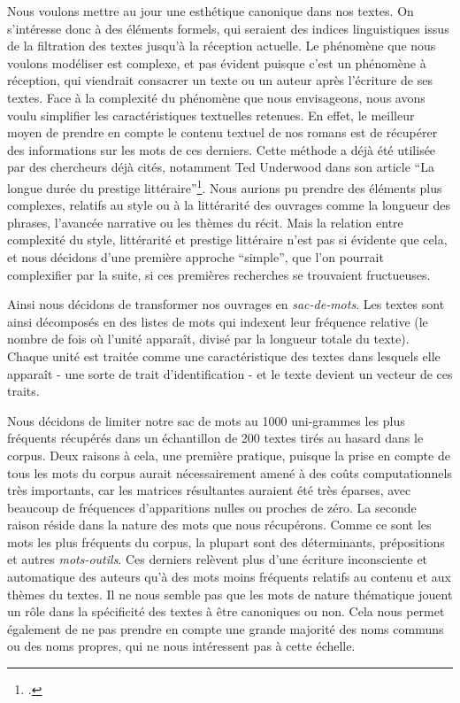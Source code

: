 Nous voulons mettre au jour une esthétique canonique dans nos textes. On s'intéresse donc à des éléments formels, qui seraient des indices linguistiques issus de la filtration des textes jusqu'à la réception actuelle. Le phénomène que nous voulons modéliser est complexe, et pas évident puisque c'est un phénomène à réception, qui viendrait consacrer un texte ou un auteur après l'écriture de ses textes. Face à la complexité du phénomène que nous envisageons, nous avons voulu simplifier les caractéristiques textuelles retenues. En effet, le meilleur moyen de prendre en compte le contenu textuel de nos romans est de récupérer des informations sur les mots de ces derniers. Cette méthode a déjà été utilisée par des chercheurs déjà cités, notamment Ted Underwood dans son article \enquote{La longue durée du prestige littéraire}\footcites{underwood_longue_2016}.  Nous aurions pu prendre des éléments plus complexes, relatifs au style ou à la littérarité des ouvrages comme la longueur des phrases, l'avancée narrative ou les thèmes du récit. Mais la relation entre complexité du style, littérarité et prestige littéraire n'est pas si évidente que cela, et nous décidons d'une première approche \enquote{simple}, que l'on pourrait complexifier par la suite, si ces premières recherches se trouvaient fructueuses.

Ainsi nous décidons de transformer nos ouvrages en \textit{sac-de-mots}. Les textes sont ainsi décomposés en des listes de mots qui indexent leur fréquence relative (le nombre de fois où l'unité apparaît, divisé par la longueur totale du texte). Chaque unité est traitée comme une caractéristique des textes dans lesquels elle apparaît - une sorte de trait d'identification - et le texte devient un vecteur de ces traits. 

Nous décidons de limiter notre sac de mots au 1000 uni-grammes les plus fréquents récupérés dans un échantillon de 200 textes tirés au hasard dans le corpus.  Deux raisons à cela, une première pratique, puisque la prise en compte de tous les mots du corpus aurait nécessairement amené à des coûts computationnels très importants, car les matrices résultantes auraient été très éparses, avec beaucoup de fréquences d'apparitions nulles ou proches de zéro. La seconde raison réside dans la nature des mots que nous récupérons. Comme ce sont les mots les plus fréquents du corpus, la plupart sont des déterminants, prépositions et autres \textit{mots-outils}. Ces derniers relèvent plus d'une écriture inconsciente et automatique des auteurs qu'à des mots moins fréquents relatifs au contenu et aux thèmes du textes. Il ne nous semble pas que les mots de nature thématique jouent un rôle dans la spécificité des textes à être canoniques ou non. Cela nous permet également de ne pas prendre en compte une grande majorité des noms communs ou des noms propres, qui ne nous intéressent pas à cette échelle.

